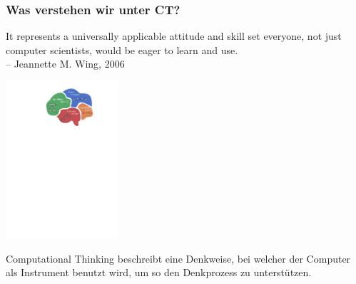 \documentclass[german,aspectratio=169]{beamer}
\begin{document}
\begin{frame}
	\frametitle{Was verstehen wir unter CT?}
	\begin{quoting}
		\glqq It represents a universally applicable attitude and skill set everyone, not just computer scientists, would be eager to learn and use.\grqq \\-- Jeannette M. Wing, 2006 \cite{wing:2006}
	\end{quoting}
	\begin{center}
		\includegraphics[width=0.31\textwidth]{./figs/ct-logo}
	\end{center}
	Computational Thinking beschreibt eine Denkweise, bei welcher der Computer als Instrument benutzt wird, um so den Denkprozess zu unterstützen.
\end{frame}


\end{document}
